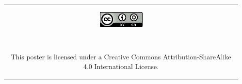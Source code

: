 \documentclass[25pt, margin=0mm, innermargin=15mm, blockverticalspace=15mm, colspace=15mm, subcolspace=8mm]{tikzposter}
\begin{document}
\begin{columns}
{\vspace{0.3cm}

\textcolor{gray}{
\hrulefill
}

\vspace{0.1cm}

\newcommand{\qrcodesize}{0.05\linewidth}


\begin{center}
\begin{tabular}{c}



\begin{minipage}{0.1\linewidth}
\href{http://creativecommons.org/licenses/by-sa/4.0/}{\includegraphics[width=\textwidth]{ccbysa}}
\end{minipage}
~
\begin{minipage}{0.7\linewidth}
\small This poster is licensed under a Creative Commons Attribution-ShareAlike 4.0 International License.
\end{minipage}

\end{tabular}
\end{center}

\vspace{-0.08cm}
}





\end{columns}
\end{document}
